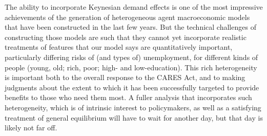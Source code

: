 \documentclass[titlepage,letterpaper]{\econtex}
\providecommand{\texname}{ConsumptionResponse}%
\begin{document}
The ability to incorporate Keynesian demand effects is one of the most impressive achievements of the generation of heterogeneous agent macroeconomic models that have been constructed in the last few years.
But the technical challenges of constructing those models are such that they cannot yet incorporate realistic treatments of features that our model says are quantitatively important, particularly differing risks of (and types of) unemployment, for different kinds of people (young, old; rich, poor; high- and low-education).
This rich heterogeneity is important both to the overall response to the CARES Act, and to making judgments about the extent to which it has been successfully targeted to provide benefits to those who need them most.
A fuller analysis that incorporates such heterogeneity, which is of intrinsic interest to policymakers, as well as a satisfying treatment of general equilibrium will have to wait for another day, but that day is likely not far off.


\pagebreak

\small

\normalsize


\pagebreak
\appendix
\setcounter{table}{0}
\renewcommand{\thetable}{A\arabic{table}}

\renewcommand{\onlyinsubfile}[1]{}
\renewcommand{\notinsubfile}[1]{#1}



\end{document}
